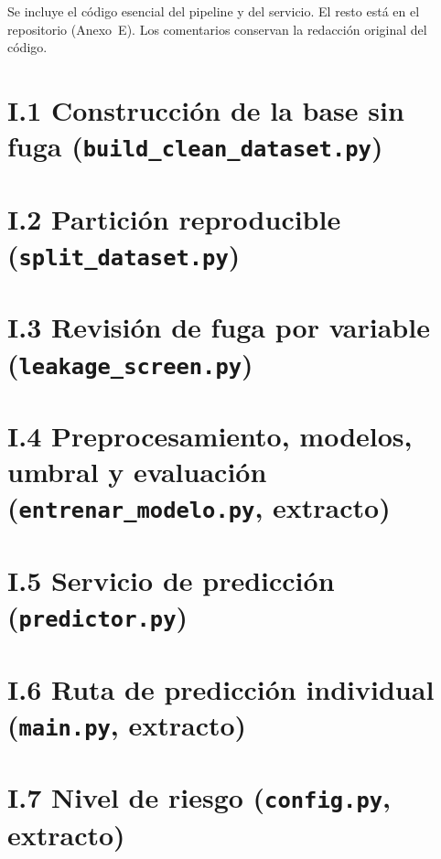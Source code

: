 
Se incluye el código esencial del pipeline y del servicio. El resto está en el repositorio (Anexo~E). Los comentarios conservan la redacción original del código.

\section*{I.1 Construcción de la base sin fuga (\texttt{build\_clean\_dataset.py})}


\section*{I.2 Partición reproducible (\texttt{split\_dataset.py})}


\section*{I.3 Revisión de fuga por variable (\texttt{leakage\_screen.py})}


\section*{I.4 Preprocesamiento, modelos, umbral y evaluación (\texttt{entrenar\_modelo.py}, extracto)}


\section*{I.5 Servicio de predicción (\texttt{predictor.py})}


\section*{I.6 Ruta de predicción individual (\texttt{main.py}, extracto)}


\section*{I.7 Nivel de riesgo (\texttt{config.py}, extracto)}

